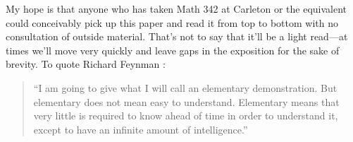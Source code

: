 My hope is that anyone who has taken Math 342 at Carleton or the equivalent could conceivably pick up this paper and read it from top to bottom with no consultation of outside material.
That's not to say that it'll be a light read---at times we'll move very quickly and leave gaps in the exposition for the sake of brevity. To quote Richard Feynman \cite[148]{feynmans-lost-lecture}:

\begin{quote}
    ``I am going to give what I will call an elementary demonstration. But elementary does not mean easy to understand. Elementary means that very little is required to know ahead of time in order to understand it, except to have an infinite amount of intelligence.''
\end{quote}

